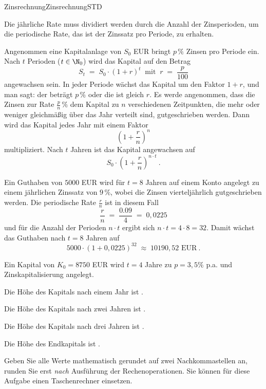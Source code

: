 \begin{MXContent}{Zinsrechnung}{Zinsrechnung}{STD}
\begin{MInfo}
Die jährliche Rate muss dividiert werden durch die Anzahl der Zinsperioden,
um die periodische Rate, das ist der Zinssatz pro Periode, zu erhalten.
\end{MInfo}

Angenommen eine Kapitalanlage von $S_{0}$ EUR bringt $p\,\%$ Zinsen pro Periode ein. Nach $t$ Perioden ($t\in \N_0$) wird das Kapital auf den Betrag
$$
S_{t} \;=\; S_{0}\cdot (1+r)^{t} \;\;\text{mit}\;\; r\;=\;\frac{p}{100}
$$
angewachsen sein. In jeder Periode wächst das Kapital um den Faktor $1+r$, und man sagt: der  beträgt $p\,\%$ oder die  ist gleich $r$.
Es werde angenommen, dass die Zinsen zur Rate $\frac{p}{n}\,\%$ dem Kapital zu $n$ verschiedenen Zeitpunkten, die mehr oder weniger gleichmäßig über das Jahr verteilt sind,
gutgeschrieben werden. Dann wird das Kapital jedes Jahr mit einem Faktor
$$
\left(1+\frac{r}{n}\right)^{n}
$$
multipliziert. Nach $t$ Jahren ist das Kapital angewachsen auf
$$
S_{0}\cdot \left(1+\frac{r}{n} \right)^{n\cdot t}\: .
$$

\begin{MExample}
Ein Guthaben von $5000$ EUR wird für $t=8$ Jahren auf einem Konto angelegt zu einem jährlichen Zinssatz von $9\,\%$,
wobei die Zinsen vierteljährlich gutgeschrieben werden. Die periodische Rate $\frac{r}{n}$ ist in diesem Fall
$$
\frac{r}{n} \;=\;\frac{0.09}{4} \; =\; 0,0225
$$
und für die Anzahl der Perioden $n\cdot t$ ergibt sich
$n\cdot t = 4\cdot 8=32$. Damit wächst das Guthaben nach $t=8$ Jahren auf
$$
5000\cdot (1+0,0225)^{32}\; \approx \;10190,52 \text{ EUR}\: .
$$
\end{MExample}


\begin{MExercise}
Ein Kapital von $K_0=8750$ EUR wird $t=4$ Jahre zu $p=3,5\%$ p.a. und Zinskapitalisierung angelegt.
\begin{MExerciseItems}
\item{Die Höhe des Kapitals nach einem Jahr ist .}
\item{Die Höhe des Kapitals nach zwei Jahren ist .}
\item{Die Höhe des Kapitals nach drei Jahren ist .}
\item{Die Höhe des Endkapitals ist .}
\end{MExerciseItems}
Geben Sie alle Werte mathematisch gerundet auf zwei Nachkommastellen an, runden Sie erst \textit{nach} Ausführung der Rechenoperationen.
Sie können für diese Aufgabe einen Taschenrechner einsetzen.


\end{MExercise}
\end{MXContent}

